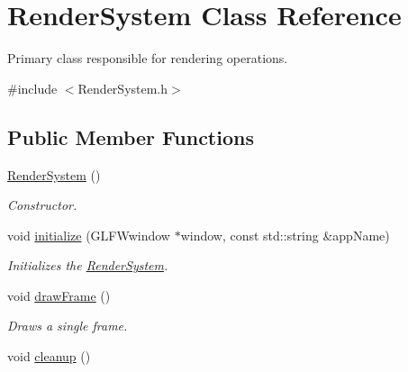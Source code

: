 \hypertarget{class_render_system}{}\section{Render\+System Class Reference}
\label{class_render_system}


Primary class responsible for rendering operations.  




{\ttfamily \#include $<$Render\+System.\+h$>$}

\subsection*{Public Member Functions}
\begin{DoxyCompactItemize}
\item 
\mbox{\label{class_render_system_a20496a8f52c4eb755d4bfcaba2e98e1c}} 
\mbox{\hyperlink{class_render_system_a20496a8f52c4eb755d4bfcaba2e98e1c}{Render\+System}} ()
\begin{DoxyCompactList}\small\item\em Constructor. \end{DoxyCompactList}\item 
\mbox{\label{class_render_system_aa4d0d7ba3d8c56cb089cb7b6609c5cac}} 
void \mbox{\hyperlink{class_render_system_aa4d0d7ba3d8c56cb089cb7b6609c5cac}{initialize}} (G\+L\+F\+Wwindow $\ast$window, const std\+::string \&app\+Name)
\begin{DoxyCompactList}\small\item\em Initializes the \mbox{\hyperlink{class_render_system}{Render\+System}}. \end{DoxyCompactList}\item 
\mbox{\label{class_render_system_a4bc6523a059eacee7fb4dd20657c4713}} 
void \mbox{\hyperlink{class_render_system_a4bc6523a059eacee7fb4dd20657c4713}{draw\+Frame}} ()
\begin{DoxyCompactList}\small\item\em Draws a single frame. \end{DoxyCompactList}\item 
\mbox{\label{class_render_system_a9d20419e00ec4e1bc4cfd77689b575c8}} 
void \mbox{\hyperlink{class_render_system_a9d20419e00ec4e1bc4cfd77689b575c8}{cleanup}} ()

\end{DoxyCompactItemize}
